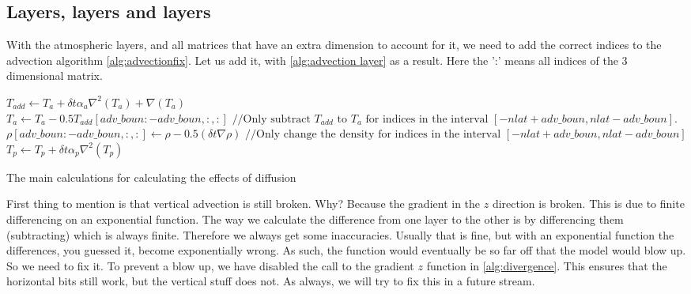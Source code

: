 \subsection{Layers, layers and layers}
With the atmospheric layers, and all matrices that have an extra dimension to account for it, we need to add the correct indices to the advection algorithm \autoref{alg:advectionfix}. Let us 
add it, with \autoref{alg:advection layer} as a result. Here the ':' means all indices of the 3 dimensional matrix. 

\begin{algorithm}
    $T_{add} \leftarrow T_a + \delta t \alpha_a \nabla^2(T_a) + \nabla(T_a)$ \;
    $T_a \leftarrow T_a - 0.5T_{add}[adv\_boun:-adv\_boun, :, :] \text{ //Only subtract } T_{add} \text{ to } T_a \text{ for indices in the interval } [-nlat + adv\_boun, nlat - adv\_boun]$. \;
    $\rho[adv\_boun: -adv\_boun, :, :] \leftarrow \rho - 0.5(\delta t \nabla \rho) \text{ //Only change the density for indices in the interval } [-nlat + adv\_boun, nlat - adv\_boun]$ \;
    $T_p \leftarrow T_p + \delta t \alpha_p \nabla^2(T_p)$ \;
    \caption{The main calculations for calculating the effects of diffusion}
    \label{alg:advection layer}
\end{algorithm}

First thing to mention is that vertical advection is still broken. Why? Because the gradient in the $z$ direction is broken. This is due to finite differencing on an exponential function. The way
we calculate the difference from one layer to the other is by differencing them (subtracting) which is always finite. Therefore we always get some inaccuracies. Usually that is fine, but with an 
exponential function the differences, you guessed it, become exponentially wrong. As such, the function would eventually be so far off that the model would blow up. So we need to fix it. To 
prevent a blow up, we have disabled the call to the gradient $z$ function in \autoref{alg:divergence}. This ensures that the horizontal bits still work, but the vertical stuff does not.
As always, we will try to fix this in a future stream. 